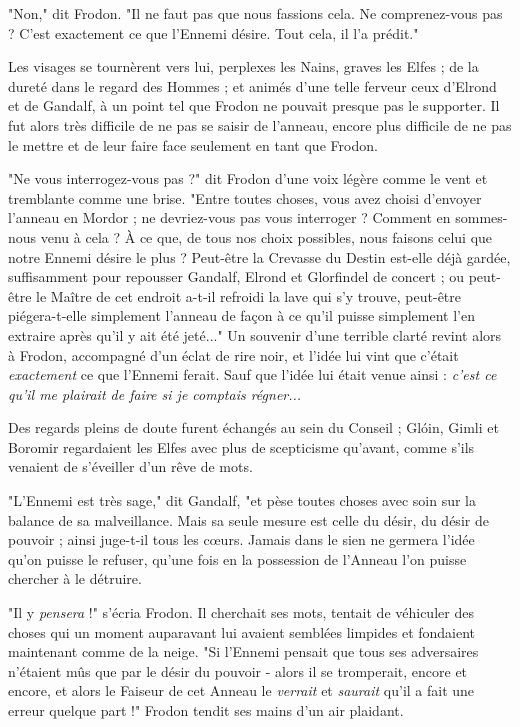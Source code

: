 "Non," dit Frodon. "Il ne faut pas que nous fassions cela. Ne comprenez-vous pas ? C'est exactement ce que l'Ennemi désire. Tout cela, il l'a prédit."

Les visages se tournèrent vers lui, perplexes les Nains, graves les Elfes ; de la dureté dans le regard des Hommes ; et animés d'une telle ferveur ceux d'Elrond et de Gandalf, à un point tel que Frodon ne pouvait presque pas le supporter. Il fut alors très difficile de ne pas se saisir de l'anneau, encore plus difficile de ne pas le mettre et de leur faire face seulement en tant que Frodon.

"Ne vous interrogez-vous pas ?" dit Frodon d'une voix légère comme le vent et tremblante comme une brise. "Entre toutes choses, vous avez choisi d'envoyer l'anneau en Mordor ; ne devriez-vous pas vous interroger ? Comment en sommes-nous venu à cela ? À ce que, de tous nos choix possibles, nous faisons celui que notre Ennemi désire le plus ? Peut-être la Crevasse du Destin est-elle déjà gardée, suffisamment pour repousser Gandalf, Elrond et Glorfindel de concert ; ou peut-être le Maître de cet endroit a-t-il refroidi la lave qui s'y trouve, peut-être piégera-t-elle simplement l'anneau de façon à ce qu'il puisse simplement l'en extraire après qu'il y ait été jeté..." Un souvenir d'une terrible clarté revint alors à Frodon, accompagné d'un éclat de rire noir, et l'idée lui vint que c'était \emph{exactement}  ce que l'Ennemi ferait. Sauf que l'idée lui était venue ainsi : \emph{c'est ce qu'il me plairait de faire si je comptais régner...} 

Des regards pleins de doute furent échangés au sein du Conseil ; Glóin, Gimli et Boromir regardaient les Elfes avec plus de scepticisme qu'avant, comme s'ils venaient de s'éveiller d'un rêve de mots.

"L'Ennemi est très sage," dit Gandalf, "et pèse toutes choses avec soin sur la balance de sa malveillance. Mais sa seule mesure est celle du désir, du désir de pouvoir ; ainsi juge-t-il tous les cœurs. Jamais dans le sien ne germera l'idée qu'on puisse le refuser, qu'une fois en la possession de l'Anneau l'on puisse chercher à le détruire.

"Il y \emph{pensera}  !" s'écria Frodon. Il cherchait ses mots, tentait de véhiculer des choses qui un moment auparavant lui avaient semblées limpides et fondaient maintenant comme de la neige. "Si l'Ennemi pensait que tous ses adversaires n'étaient mûs que par le désir du pouvoir - alors il se tromperait, encore et encore, et alors le Faiseur de cet Anneau le \emph{verrait}  et \emph{saurait}  qu'il a fait une erreur quelque part !" Frodon tendit ses mains d'un air plaidant.

